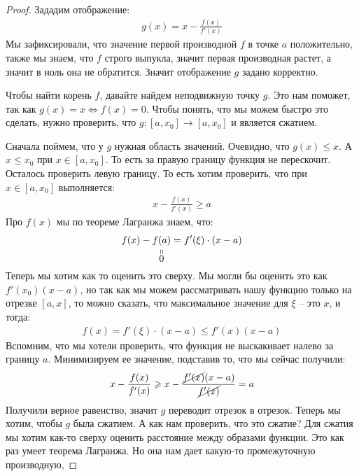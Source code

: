 \begin{proof}
    Зададим отображение: 
    \begin{gather*}
        g(x) = x - \frac{f(x)}{f'(x)}
    \end{gather*}
    Мы зафиксировали, что значение первой производной $f$ в точке $a$ положительно, также мы знаем, что $f$ строго выпукла, значит первая производная 
    растет, а значит в ноль она не обратится. Значит отображение $g$ задано корректно. 

    Чтобы найти корень $f$, давайте найдем неподвижную точку $g$. Это нам поможет, так как $g(x) = x \Longleftrightarrow f(x) = 0$. Чтобы понять, что мы можем быстро это сделать, 
    нужно проверить, что $g: [a, x_0] \longrightarrow [a, x_0]$ и является сжатием.

    Сначала поймем, что у $g$ нужная область значений. 
    Очевидно, что $g(x) \leqslant x$. А $x \leqslant x_0$ при $x \in [a, x_0]$. 
    То есть за правую границу функция не перескочит. Осталось проверить левую границу. То есть хотим проверить, что при $x \in [a, x_0]$ выполняется:
    \begin{gather*}
        x - \frac{f(x)}{f'(x)} \geqslant a
    \end{gather*}
    Про $f(x)$ мы по теореме Лагранжа знаем, что:
    \begin{gather*}
        f(x) - \stackbelow{f(a)}{0} = f'(\xi)\cdot(x - a)
    \end{gather*}
    Теперь мы хотим как то оценить это сверху. 
    Мы могли бы оценить это как $f'(x_0)(x - a)$, но так как мы можем рассматривать 
    нашу функцию только на отрезке $[a, x]$, то можно сказать, что максимальное значение для $\xi$ -- это $x$, и тогда: 
    \begin{gather*}
        f(x) = f'(\xi)\cdot(x - a) \leqslant f'(x)(x-a)
    \end{gather*}
    Вспомним, что мы хотели проверить, что функция не выскакивает налево за границу $a$. 
    Минимизируем ее значение, подставив то, что мы сейчас получили:
    \begin{gather*}
        x - \frac{f(x)}{f'(x)} \geqslant x - \frac{\cancel{f'(x)}(x - a)}{\cancel{f'(x)}} = a
    \end{gather*}
    Получили верное равенство, значит $g$ переводит отрезок в отрезок. 
    Теперь мы хотим, чтобы $g$ была сжатием. А как нам проверить, что это сжатие? 
    Для сжатия мы хотим как-то сверху оценить расстояние между образами функции. 
    Это как раз умеет теорема Лагранжа. Но она нам дает какую-то промежуточную производную, 

\end{proof}
